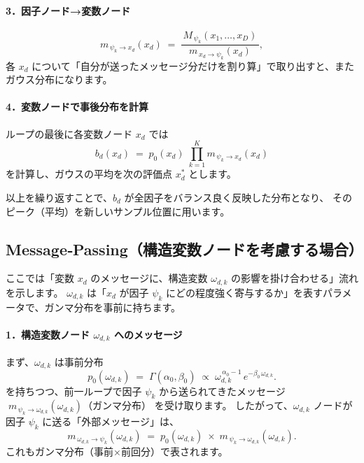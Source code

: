\documentclass[oneside,onecolumn]{jlreq}
\theoremstyle{plain}
\begin{document}
\paragraph{3．因子ノード→変数ノード}
\[
    m_{\,\psi_k \to x_d}(x_d)
    \;=\;
    \frac{\,M_{\,\psi_k}(x_1,\dots,x_D)\,}
         {\,m_{\,x_d \to \psi_k}(x_d)\,},
\]
各 \(x_d\) について「自分が送ったメッセージ分だけを割り算」で取り出すと、またガウス分布になります。

\paragraph{4．変数ノードで事後分布を計算}
ループの最後に各変数ノード \(x_d\) では
\[
    b_d(x_d)
    \;=\;
    p_{0}(x_d)\;\prod_{k=1}^K m_{\,\psi_k \to x_d}(x_d)
\]
を計算し、ガウスの平均を次の評価点 \(x_d^*\) とします。

以上を繰り返すことで、\(b_d\) が全因子をバランス良く反映した分布となり、
そのピーク（平均）を新しいサンプル位置に用います。


\subsection{Message‐Passing（構造変数ノードを考慮する場合）}
ここでは「変数 \(x_d\) のメッセージに、構造変数 \(\omega_{d,k}\) の影響を掛け合わせる」流れを示します。
\(\omega_{d,k}\) は「\(x_d\) が因子 \(\psi_k\) にどの程度強く寄与するか」を表すパラメータで、ガンマ分布を事前に持ちます。

\paragraph{1．構造変数ノード \(\omega_{d,k}\) へのメッセージ}
まず、\(\omega_{d,k}\) は事前分布
\[
    p_{0}(\omega_{d,k})
    \;=\; \Gamma(\alpha_0,\beta_0)
    \;\propto\;
    \omega_{d,k}^{\,\alpha_0 - 1}\,e^{-\beta_0\,\omega_{d,k}}.
\]
を持ちつつ、前一ループで因子 \(\psi_k\) から送られてきたメッセージ
\(\;m_{\,\psi_k \to \omega_{d,k}}(\omega_{d,k})\)（ガンマ分布） を受け取ります。
したがって、\(\omega_{d,k}\) ノードが因子 \(\psi_k\) に送る「外部メッセージ」は、
\[
    m_{\,\omega_{d,k}\to \psi_k}(\omega_{d,k})
    \;=\;
    p_{0}(\omega_{d,k})
    \;\times\;
    m_{\,\psi_k \to \omega_{d,k}}(\omega_{d,k}).
\]
これもガンマ分布（事前×前回分）で表されます。
\end{document}
